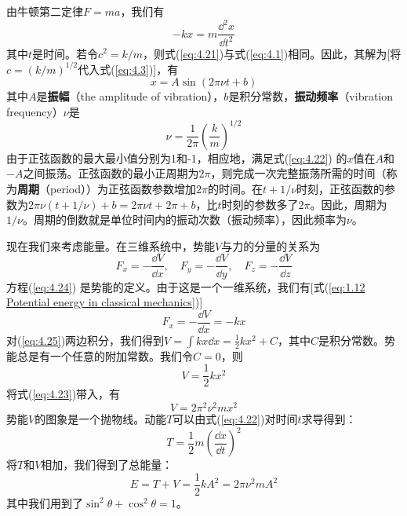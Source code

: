     由牛顿第二定律$F = ma$，我们有
    \begin{equation}
        - kx = m\frac{\dd ^2x}{\dd t^2}
        \label{eq:4.21}
    \end{equation}
    其中$t$是时间。若令$c^2 = k/m$，则式(\ref{eq:4.21})与式(\ref{eq:4.1})相同。因此，其解为[将$c = \left(k/m\right)^{1/2}$代入式(\ref{eq:4.3})]，有
    \begin{equation}
        x = A \sin\left(2\pi \nu t +b\right)
        \label{eq:4.22}
    \end{equation}
    其中$A$是\textbf{振幅}（the amplitude of vibration），$b$是积分常数，\textbf{振动频率}（vibration frequency）$\nu$是
    \begin{equation}
        \boxed{
            \nu = \frac{1}{2\pi}\left(\frac{k}{m}\right)^{1/2}
        }
        \label{eq:4.23}
    \end{equation}
    由于正弦函数的最大最小值分别为1和-1，相应地，满足式(\ref{eq:4.22}) 的$x$值在$A$和$-A$之间振荡。正弦函数的最小正周期为$2\pi$，则完成一次完整振荡所需的时间（称为\textbf{周期}（period））为正弦函数参数增加$2\pi$的时间。在$t+1/\nu$时刻，正弦函数的参数为$2\pi \nu \left(t+1/\nu\right) + b = 2\pi \nu t + 2\pi + b$，比$t$时刻的参数多了$2\pi$。因此，周期为$1/\nu$。周期的倒数就是单位时间内的振动次数（振动频率），因此频率为$\nu$。

    现在我们来考虑能量。在三维系统中，势能$V$与力的分量的关系为
    \begin{equation}
        \boxed{
            F_x = -\frac{\dd V}{\dd x}, \quad F_y = -\frac{\dd V}{\dd y}, \quad F_z = -\frac{\dd V}{\dd z}
        }
        \label{eq:4.24}
    \end{equation}
    方程(\ref{eq:4.24}) 是势能的定义。由于这是一个一维系统，我们有[式(\ref{eq:1.12 Potential energy in classical mechanics})]
    \begin{equation}
        F_x = -\frac{\dd V}{\dd x} = -kx
        \label{eq:4.25}
    \end{equation}
    对(\ref{eq:4.25})两边积分，我们得到$V = \int kx \dd x = \frac{1}{2}kx^2 + C$，其中$C$是积分常数。势能总是有一个任意的附加常数。我们令$C = 0$，则
    \begin{equation}
        \boxed{
            V = \frac{1}{2}kx^2
        }
        \label{eq:4.26}
    \end{equation}
    将式(\ref{eq:4.23})带入，有
    \begin{equation}
        V = 2\pi^2 \nu^2 m x^2
        \label{eq:4.27}
    \end{equation}
    势能$V$的图象是一个抛物线。动能$T$可以由式(\ref{eq:4.22})对时间$t$求导得到：
    \begin{equation}
        T = \frac{1}{2}m\left(\frac{\dd x}{\dd t}\right)^2
        \label{eq:4.28}
    \end{equation}
    将$T$和$V$相加，我们得到了总能量：
    \begin{equation}
        E = T + V = \frac{1}{2}kA^2 = 2\pi\nu^2mA^2
        \label{eq:4.29}
    \end{equation}
    其中我们用到了$\sin^2\theta + \cos^2\theta = 1$。

